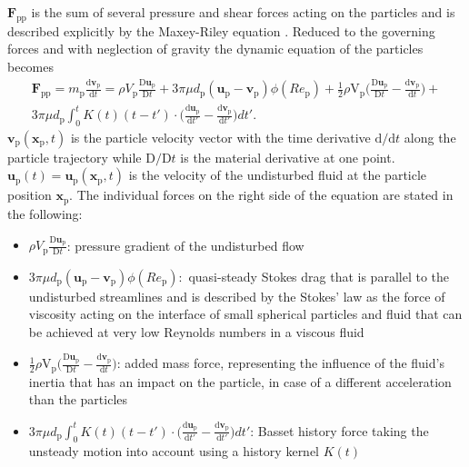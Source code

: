 \documentclass[11pt,a4paper,openany,oneside,parskip=half*]{article}
\renewcommand*\vec[1]{\boldsymbol{#1}}
\begin{document}
$\vec{F}_\mathrm{pp}$ is the sum of several pressure and shear forces acting on the particles and is described explicitly by the Maxey-Riley equation \cite{EquationOfMotionForASmallRigidSphereInANonuniformFlow}.
Reduced to the governing forces and with neglection of gravity the dynamic equation of the particles becomes
\begin{multline} \label{navier_stokes_particle}
 \vec{F}_\mathrm{pp} = m_\mathrm{p} \frac{\mathrm{d}\vec{v}_\mathrm{p}}{\mathrm{d}t} =\rho V_\mathrm{p}\frac{\mathrm{D}\vec{u}_\mathrm{p}}{\mathrm{D}t} + 3 \pi \mu d_\mathrm{p}(\vec{u}_\mathrm{p}-\vec{v}_\mathrm{p})\phi(Re_\mathrm{p})+ \frac{1}{2}\rho \mathrm{V}_\mathrm{p} \biggl(\frac{\mathrm{D}\vec{u}_\mathrm{p}}{\mathrm{D}t}-\frac{\mathrm{d}\vec{v}_\mathrm{p}}{\mathrm{d}t}\biggl) +
\\ 3 \pi \mu d_\mathrm{p}\int_{0}^{t} K(t) (t-t') \cdot \biggl(\frac{\mathrm{d}\vec{u}_\mathrm{p}}{\mathrm{d}t'}- \frac{\mathrm{d}\vec{v}_\mathrm{p}}{\mathrm{d}t'}\biggl)dt'.
\end{multline}
$\vec{v}_\mathrm{p}(\vec{x}_\mathrm{p},t)$ is the particle velocity vector with the time derivative $\mathrm{d}/\mathrm{d}t$ along the particle trajectory while $\mathrm{D}/\mathrm{D}t$  is the material derivative at one point. $\vec{u}_\mathrm{p}(t) = \vec{u}_\mathrm{p}(\vec{x}_\mathrm{p},t)$ is the velocity of the undisturbed fluid at the particle position $\vec{x}_\mathrm{p}$.
The individual forces on the right side of the equation are stated in the following:
\begin{itemize} 
\item  $\rho V_\mathrm{p}\frac{\mathrm{D}\vec{u}_\mathrm{p}}{\mathrm{D}t}$: \newline
pressure gradient of the undisturbed flow
\item $3 \pi \mu d_\mathrm{p}(\vec{u}_\mathrm{p}-\vec{v}_\mathrm{p})\phi(Re_\mathrm{p}):$\newline
quasi-steady Stokes drag that is parallel to the undisturbed streamlines and is described by the Stokes' law as the force of viscosity acting on the interface of small spherical particles and fluid that can be achieved at very low Reynolds numbers in a viscous fluid

\item $\frac{1}{2}\rho \mathrm{V}_\mathrm{p} \biggl(\frac{\mathrm{D}\vec{u}_\mathrm{p}}{\mathrm{D}t}-\frac{\mathrm{d}\vec{v}_\mathrm{p}}{\mathrm{d}t}\biggl)$:
\newline
added mass force, representing the influence of the fluid's inertia that has an impact on the particle, in case of a different acceleration than the particles
\item $3 \pi \mu d_\mathrm{p}\int_{0}^{t} K(t) (t-t') \cdot \biggl(\frac{\mathrm{d}\vec{u}_\mathrm{p}}{\mathrm{d}t'}- \frac{\mathrm{d}\vec{v}_\mathrm{p}}{\mathrm{d}t'}\biggl)dt'$: \newline
Basset history force taking the unsteady motion into account using a history kernel $K(t)$ 
\end{itemize}
\end{document}
